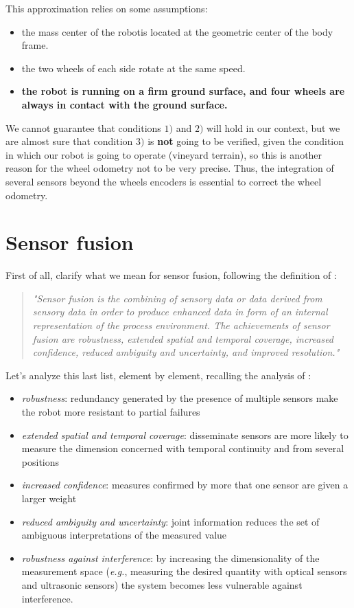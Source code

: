 This approximation relies on some assumptions:
\begin{itemize}
	\item the mass center of the robotis located at the geometric center of the body frame.
	\item the two wheels of each side rotate at the same speed.
	\item \textbf{the robot is running on a firm ground surface, and four wheels are always in contact with the ground surface.}
\end{itemize}
We cannot guarantee that conditions $1)$ and $2)$ will hold in our context, but we are almost sure that condition $3)$ is \textbf{not} going to be verified, given the condition in which our robot is going to operate (vineyard terrain), so this is another reason for the wheel odometry not to be very precise. Thus, the integration of several sensors beyond the wheels encoders is essential to correct the wheel odometry.

\section{Sensor fusion}\label{sec:sensorFusion}

First of all, clarify what we mean for sensor fusion, following the definition of  \cite{sensorFusionDef}:
\blockquote{\textit{
"Sensor fusion is the combining of sensory data or data derived from sensory
data in order to produce enhanced data in form of an internal representation
of the process environment. The achievements of sensor fusion are
robustness, extended spatial and temporal coverage, increased confidence,
reduced ambiguity and uncertainty, and improved resolution."}}
Let's analyze this last list, element by element, recalling the analysis of \cite{sensorFusionAdvantages}:
\begin{itemize}
	\item \textit{robustness}: redundancy generated by the presence of multiple sensors make the robot more resistant to partial failures
	\item \textit{extended spatial and temporal coverage}: disseminate sensors are more likely to measure the dimension concerned with temporal continuity and from several positions
	\item \textit{increased confidence}: measures confirmed by more that one sensor are given a larger weight
	\item \textit{reduced ambiguity and uncertainty}: joint information reduces the set
of ambiguous interpretations of the measured value
	\item \textit{robustness against interference}:  by increasing the dimensionality of
the measurement space (\textit{e.g.}, measuring the desired quantity with optical sensors and ultrasonic sensors) the system becomes less vulnerable
against interference.
\end{itemize}

